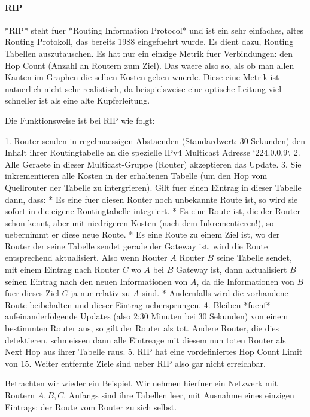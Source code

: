 \paragraph{RIP} 

*RIP* steht fuer *Routing Information Protocol* und ist ein sehr einfaches,
altes Routing Protokoll, das bereits 1988 eingefuehrt wurde. Es dient dazu,
Routing Tabellen auszutauschen. Es hat nur ein einzige Metrik fuer Verbindungen:
den Hop Count (Anzahl an Routern zum Ziel). Das waere also so, als ob man allen
Kanten im Graphen die selben Kosten geben wuerde. Diese eine Metrik ist
natuerlich nicht sehr realistisch, da beispielsweise eine optische Leitung viel
schneller ist als eine alte Kupferleitung.

Die Funktionsweise ist bei RIP wie folgt:

1. Router senden in regelmaessigen Abstaenden (Standardwert: 30 Sekunden) den
   Inhalt ihrer Routingtabelle an die spezielle IPv4 Multicast Adresse
   `224.0.0.9`.
2. Alle Geraete in dieser Multicast-Gruppe (Router) akzeptieren das
   Update.
3. Sie inkrementieren alle Kosten in der erhaltenen Tabelle (um den Hop vom
   Quellrouter der Tabelle zu intergrieren). Gilt fuer einen Eintrag in dieser
   Tabelle dann, dass:
   * Es eine fuer diesen Router noch unbekannte Route ist, so wird sie sofort in
     die eigene Routingtabelle integriert.
   * Es eine Route ist, die der Router schon kennt, aber mit niedrigeren Kosten
     (nach dem Inkrementieren!), so uebernimmt er diese neue Route.
   * Es eine Route zu einem Ziel ist, wo der Router der seine Tabelle sendet
     gerade der Gateway ist, wird die Route entsprechend aktualisiert. Also wenn
     Router $A$ Router $B$ seine Tabelle sendet, mit einem Eintrag nach Router
     $C$ wo $A$ bei $B$ Gateway ist, dann aktualisiert $B$ seinen Eintrag nach
     den neuen Informationen von $A$, da die Informationen von $B$ fuer dieses
     Ziel $C$ ja nur relativ zu $A$ sind.
   * Andernfalls wird die vorhandene Route beibehalten und dieser Eintrag
     uebersprungen.
4. Bleiben *fuenf* aufeinanderfolgende Updates (also 2:30 Minuten bei 30
   Sekunden) von einem bestimmten Router aus, so gilt der Router als tot. Andere
   Router, die dies detektieren, schmeissen dann alle Eintreage mit diesem nun
   toten Router als Next Hop aus ihrer Tabelle raus.
5. RIP hat eine vordefiniertes Hop Count Limit von 15. Weiter entfernte Ziele
   sind ueber RIP also gar nicht erreichbar.

Betrachten wir wieder ein Beispiel. Wir nehmen hierfuer ein Netzwerk mit Routern
$A, B, C$. Anfangs sind ihre Tabellen leer, mit Ausnahme eines einzigen
Eintrags: der Route vom Router zu sich selbst.

